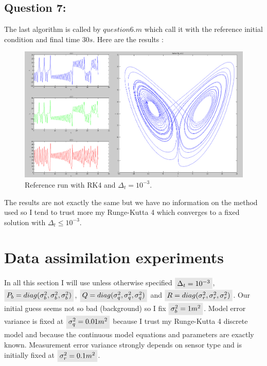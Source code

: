 \documentclass[11pt,a4paper]{article}
\renewcommand{\colbox}[1]{\colorbox{lightgray}{$ #1 $}}
\begin{document}
\vskip 0.5cm
\subsection{Question 7:} 
\vskip 0.5cm

The last algorithm is called by $question6.m$ which call it with the reference initial condition and final time $30s$. Here are the results :

\begin{figure}[H]
   \includegraphics[width=16cm]{results.png}
   \caption{Reference run with RK4 and $\Delta_t = 10^{-3}$.}
\end{figure}

The results are not exactly the same but we have no information on the method used so I tend to trust more my Runge-Kutta 4 which converges to a fixed solution with $\Delta_t \leq 10^{-3}$.

\clearpage

\section{Data assimilation experiments}

In all this section I will use unless otherwise specified $\colbox{\Delta_t = 10^{-3}}$, $\colbox{P_b = diag(\sigma_b^2, \sigma_b^2, \sigma_b^2)}$, $\colbox{Q = diag(\sigma_q^2, \sigma_q^2, \sigma_q^2)}$ and $\colbox{R = diag(\sigma_r^2, \sigma_r^2, \sigma_r^2)}$. 
Our initial guess seems not so bad (background) so I fix $\colbox{\sigma_b^2 = 1m^2}$.
Model error variance is fixed at $\colbox{\sigma_q^2 = 0.01 m^2}$ because I trust my Runge-Kutta 4 discrete model and because the continuous model equations and parameters are exactly known. 
Measurement error variance strongly depends on sensor type and is initially fixed at $\colbox{\sigma_r^2 = 0.1m^2}$. 
\end{document}
